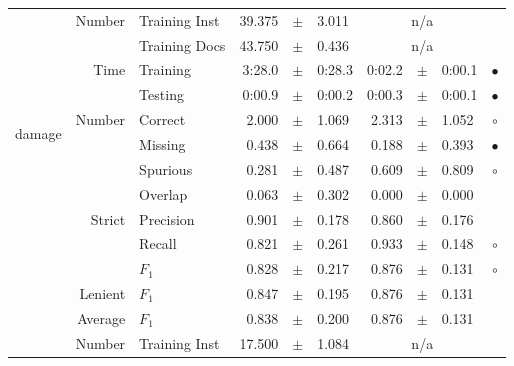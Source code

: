 \begin{longtable}{|r|r|l||rcl|rcl|c|}
\cline{2-10} & \multirow{2}{*}{    Number} &   Training Inst &      39.375 &  $\pm$  &       3.011 &    \multicolumn{3}{c|}{n/a}         &  \\
\cline{3-10} &                             &   Training Docs &      43.750 &  $\pm$  &       0.436 &    \multicolumn{3}{c|}{n/a}         &  \\
\cline{2-10} & \multirow{2}{*}{      Time} &        Training &      3:28.0 &  $\pm$  &      0:28.3 &      0:02.2 &  $\pm$  &      0:00.1 & $\bullet$ \\
\cline{3-10} &                             &         Testing &      0:00.9 &  $\pm$  &      0:00.2 &      0:00.3 &  $\pm$  &      0:00.1 & $\bullet$ \\
\hline
\hline
\multirow{11}{*}{\begin{sideways}damage\end{sideways} }
             & \multirow{4}{*}{    Number} &         Correct &       2.000 &  $\pm$  &       1.069 &       2.313 &  $\pm$  &       1.052 & $\circ$ \\
\cline{3-10} &                             &         Missing &       0.438 &  $\pm$  &       0.664 &       0.188 &  $\pm$  &       0.393 & $\bullet$ \\
\cline{3-10} &                             &        Spurious &       0.281 &  $\pm$  &       0.487 &       0.609 &  $\pm$  &       0.809 & $\circ$ \\
\cline{3-10} &                             &         Overlap &       0.063 &  $\pm$  &       0.302 &       0.000 &  $\pm$  &       0.000 &  \\
\cline{2-10} & \multirow{3}{*}{    Strict} &       Precision &       0.901 &  $\pm$  &       0.178 &       0.860 &  $\pm$  &       0.176 &  \\
\cline{3-10} &                             &          Recall &       0.821 &  $\pm$  &       0.261 &       0.933 &  $\pm$  &       0.148 & $\circ$ \\
\cline{3-10} &                             &           $F_1$ &       0.828 &  $\pm$  &       0.217 &       0.876 &  $\pm$  &       0.131 & $\circ$ \\
\cline{2-10} &                     Lenient &           $F_1$ &       0.847 &  $\pm$  &       0.195 &       0.876 &  $\pm$  &       0.131 &  \\
\cline{2-10} &                     Average &           $F_1$ &       0.838 &  $\pm$  &       0.200 &       0.876 &  $\pm$  &       0.131 &  \\
\cline{2-10} & \multirow{2}{*}{    Number} &   Training Inst &      17.500 &  $\pm$  &       1.084 &    \multicolumn{3}{c|}{n/a}         &  \\

\end{longtable}
